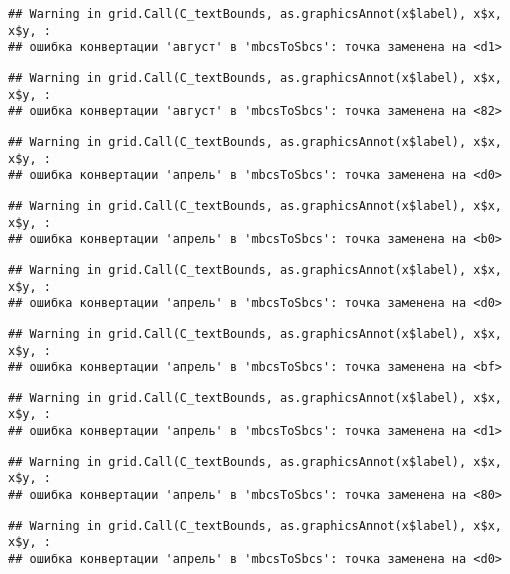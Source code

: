 \documentclass[
]{article}
\begin{document}
\begin{verbatim}
## Warning in grid.Call(C_textBounds, as.graphicsAnnot(x$label), x$x, x$y, :
## ошибка конвертации 'август' в 'mbcsToSbcs': точка заменена на <d1>
\end{verbatim}

\begin{verbatim}
## Warning in grid.Call(C_textBounds, as.graphicsAnnot(x$label), x$x, x$y, :
## ошибка конвертации 'август' в 'mbcsToSbcs': точка заменена на <82>
\end{verbatim}

\begin{verbatim}
## Warning in grid.Call(C_textBounds, as.graphicsAnnot(x$label), x$x, x$y, :
## ошибка конвертации 'апрель' в 'mbcsToSbcs': точка заменена на <d0>
\end{verbatim}

\begin{verbatim}
## Warning in grid.Call(C_textBounds, as.graphicsAnnot(x$label), x$x, x$y, :
## ошибка конвертации 'апрель' в 'mbcsToSbcs': точка заменена на <b0>
\end{verbatim}

\begin{verbatim}
## Warning in grid.Call(C_textBounds, as.graphicsAnnot(x$label), x$x, x$y, :
## ошибка конвертации 'апрель' в 'mbcsToSbcs': точка заменена на <d0>
\end{verbatim}

\begin{verbatim}
## Warning in grid.Call(C_textBounds, as.graphicsAnnot(x$label), x$x, x$y, :
## ошибка конвертации 'апрель' в 'mbcsToSbcs': точка заменена на <bf>
\end{verbatim}

\begin{verbatim}
## Warning in grid.Call(C_textBounds, as.graphicsAnnot(x$label), x$x, x$y, :
## ошибка конвертации 'апрель' в 'mbcsToSbcs': точка заменена на <d1>
\end{verbatim}

\begin{verbatim}
## Warning in grid.Call(C_textBounds, as.graphicsAnnot(x$label), x$x, x$y, :
## ошибка конвертации 'апрель' в 'mbcsToSbcs': точка заменена на <80>
\end{verbatim}

\begin{verbatim}
## Warning in grid.Call(C_textBounds, as.graphicsAnnot(x$label), x$x, x$y, :
## ошибка конвертации 'апрель' в 'mbcsToSbcs': точка заменена на <d0>
\end{verbatim}
\end{document}
